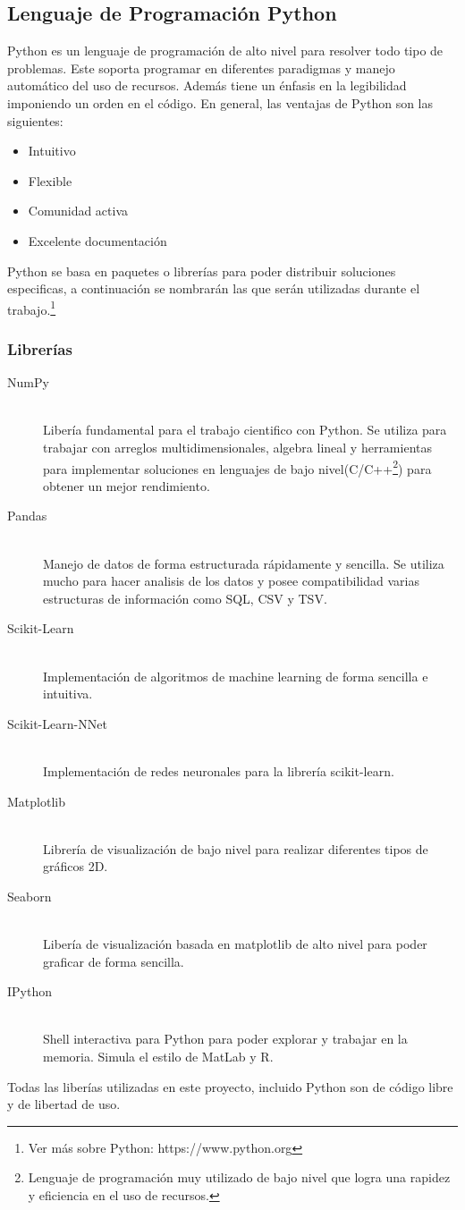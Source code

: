\subsection{Lenguaje de Programación Python}
Python es un lenguaje de programación de alto nivel para resolver todo tipo de problemas. Este soporta programar en diferentes paradigmas y manejo automático del uso de recursos. Además tiene un énfasis en la legibilidad imponiendo un orden en el código.
En general, las ventajas de Python son las siguientes:
\begin{itemize}
  \item Intuitivo
  \item Flexible
  \item Comunidad activa
  \item Excelente documentación
\end{itemize}
Python se basa en paquetes o librerías para poder distribuir soluciones especificas, a continuación se nombrarán las que serán utilizadas durante el trabajo.\footnote{Ver más sobre Python: https://www.python.org}
\subsubsection{Librerías}
\begin{description}
  \item[NumPy] \hfill \\
  Libería fundamental para el trabajo cientifico con Python. Se utiliza para trabajar con arreglos multidimensionales, algebra lineal y herramientas para implementar soluciones en lenguajes de bajo nivel(C/C++\footnote{Lenguaje de programación muy utilizado de bajo nivel que logra una rapidez y eficiencia en el uso de recursos.}) para obtener un mejor rendimiento.
  \item[Pandas] \hfill \\
  Manejo de datos de forma estructurada rápidamente y sencilla. Se utiliza mucho para hacer analisis de los datos y posee compatibilidad varias estructuras de información como SQL, CSV y TSV.
  \item[Scikit-Learn] \cite{scikit-learn} \hfill \\
  Implementación de algoritmos de machine learning de forma sencilla e intuitiva.
  \item[Scikit-Learn-NNet] \hfill \\
  Implementación de redes neuronales para la librería scikit-learn.
  \item[Matplotlib] \hfill \\
  Librería de visualización de bajo nivel para realizar diferentes tipos de gráficos 2D.
  \item[Seaborn] \hfill \\
  Libería de visualización basada en matplotlib de alto nivel para poder graficar de forma sencilla.
  \item[IPython] \hfill \\
  Shell interactiva para Python para poder explorar y trabajar en la memoria. Simula el estilo de MatLab y R.
\end{description}
Todas las liberías utilizadas en este proyecto, incluido Python son de código libre y de libertad de uso.
